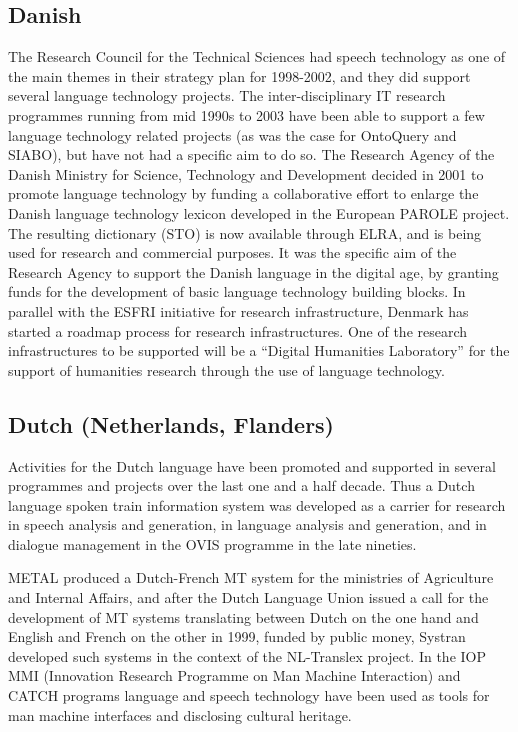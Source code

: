 \documentclass[10pt, plain]{../../metanetpaper}
\begin{document}
\begin{multicols}{2}
\begin{small}
\subsection*{Danish}
\label{sec:danish}

The Research Council for the Technical Sciences had speech technology as one of the main themes in their strategy plan for 1998-2002, and they did support several language technology projects. The inter-disciplinary IT research programmes running from mid 1990s to 2003 have been able to support a few language technology related projects (as was the case for OntoQuery and SIABO), but have not had a specific aim to do so.
The Research Agency of the Danish Ministry for Science, Technology and Development decided in 2001 to promote language technology by funding a collaborative effort to enlarge the Danish language technology lexicon developed in the European PAROLE project. The resulting dictionary (STO) is now available through ELRA, and is being used for research and commercial purposes. It was the specific aim of the Research Agency to support the Danish language in the digital age, by granting funds for the development of basic language technology building blocks.
In parallel with the ESFRI initiative for research infrastructure, Denmark has started a roadmap process for research infrastructures. One of the research infrastructures to be supported will be a “Digital Humanities Laboratory” for the support of humanities research through the use of language technology.

\subsection*{Dutch (Netherlands, Flanders)}
\label{sec:dutch-neth-fland}

Activities for the Dutch language have been promoted and supported in several programmes and projects over the last one and a half decade. Thus a Dutch language spoken train information system was developed as a carrier for research in speech analysis and generation, in language analysis and generation, and in dialogue management in the OVIS programme in the late nineties. 

METAL produced a Dutch-French MT system for the ministries of Agriculture and Internal Affairs, and after the Dutch Language Union issued a call for the development of MT systems translating between Dutch on the one hand and English and French on the other in 1999, funded by public money, Systran developed such systems in the context of the NL-Translex project. In the IOP MMI (Innovation Research Programme on Man Machine Interaction) and CATCH programs language and speech technology have been used as tools for man machine interfaces and disclosing cultural heritage.


\end{small}
\end{multicols}
\end{document}
